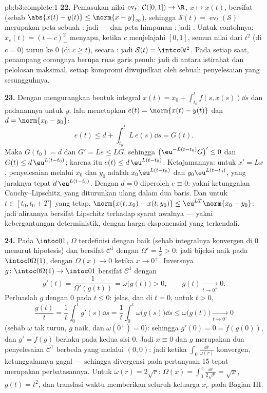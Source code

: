 \begin{solution}{pb:b3:complete:1}
\textbf{22.} Pemasukan nilai $\operatorname{ev}_t\colon
\mathcal C([0,1]) \to \R$, $x \mapsto x(t)$, bersifat 
(sebab $\abs{x(t) - y(t)} \leq \norm{x - y}_\infty$), sehingga $\mathcal
S(t) = \operatorname{ev}_t(\mathcal S)$ merupakan peta 
sebuah : jadi  --- dan peta himpunan : jadi .
Untuk contohnya: $x_c(t) = (t - c)_+^2$ menyapu, ketika $c$ menjelajahi
$[0, 1]$, semua nilai dari $t^2$ (di $c = 0$) turun ke
$0$ (di $c \geq t$), secara : jadi $\mathcal S(t) =
\intcc0{t^2}$. Pada setiap saat, penampang corongnya berupa
ruas garis penuh: jadi di antara istirahat dan pelolosan maksimal, setiap
kompromi diwujudkan oleh sebuah penyelesaian yang sesungguhnya.

\textbf{23.} Dengan mengurangkan bentuk integral $x(t) = x_0 +
\int_{t_0}^tf(s, x(s))\dd s$ dan padanannya untuk $y$, lalu
menetapkan $e(t) = \norm{x(t) - y(t)}$ dan $d = \norm{x_0 - y_0}$:
\[
e(t) \leq d + \int_{t_0}^tL\,e(s)\dd s = G(t).
\]
Maka $G(t_0) = d$ dan $G' = Le \leq LG$, sehingga $\bigl(\eu^{-L(t
- t_0)}G\bigr)' \leq 0$ dan $G(t) \leq d\,\eu^{L(t - t_0)}$;
karena itu $e(t) \leq d\,\eu^{L(t-t_0)}$. Ketajamannya: untuk $x' =
Lx$, penyelesaian melalui $x_0$ dan $y_0$ adalah $x_0\eu^{L(t -
t_0)}$ dan $y_0\eu^{L(t-t_0)}$, yang jaraknya tepat
$d\,\eu^{L(t-t_0)}$. Dengan $d = 0$ diperoleh $e \equiv 0$: yakni
ketunggalan Cauchy--Lipschitz, yang diturunkan ulang dalam dua baris. Dan
untuk $t \in [t_0, t_0 + T]$ yang tetap, $\norm{x(t; x_0) - x(t;
y_0)} \leq \eu^{LT}\norm{x_0 - y_0}$: jadi alirannya bersifat Lipschitz
terhadap syarat awalnya --- yakni kebergantungan deterministik, dengan
harga eksponensial yang terkendali.

\textbf{24.} Pada $\intoc01$, $\Omega$ terdefinisi dengan baik (sebab
integralnya konvergen di $0$ menurut hipotesis) dan bersifat $\mathcal C^1$ dengan
$\Omega' = \frac1\omega > 0$: jadi bijeksi naik pada
$\intoc0{\Omega(1)}$, dengan $\Omega(x) \to 0$ ketika $x \to 0^+$.
Inversnya $g \colon \intoc0{\Omega(1)} \to \intoc01$ bersifat
$\mathcal C^1$ dengan
\[
g'(t) = \frac1{\Omega'(g(t))} = \omega\bigl(g(t)\bigr) > 0,
\qquad g(t) \xrightarrow[t \to 0^+]{} 0 .
\]
Perluaslah $g$ dengan $0$ pada $t \leq 0$:  jelas, dan di
$t = 0$, untuk $t > 0$,
\[
\frac{g(t)}t = \frac1t\int_0^tg'(s)\dd s
= \frac1t\int_0^t\omega\bigl(g(s)\bigr)\dd s
\leq \omega\bigl(g(t)\bigr) \xrightarrow[t\to0^+]{} 0
\]
(sebab $\omega$ tak turun, $g$ naik, dan $\omega(0^+) = 0$):
sehingga $g'(0) = 0 = f(g(0))$, dan $g' = f(g)$ berlaku pada kedua sisi
$0$. Jadi $x \equiv 0$ dan $g$ merupakan dua penyelesaian $\mathcal
C^1$ berbeda yang melalui $(0, 0)$: jadi ketika $\int_0\frac{\dd r}
{\omega(r)}$ konvergen, ketunggalannya gagal --- sehingga divergensi pada
pertanyaan 15 tepat merupakan perbatasannya. Untuk $\omega(r) = 2\sqrt
r$: $\Omega(x) = \int_0^x\frac{\dd r}{2\sqrt r} = \sqrt x$,
$g(t) = t^2$, dan translasi waktu memberikan seluruh keluarga
$x_c$ pada Bagian III.


\end{solution}
